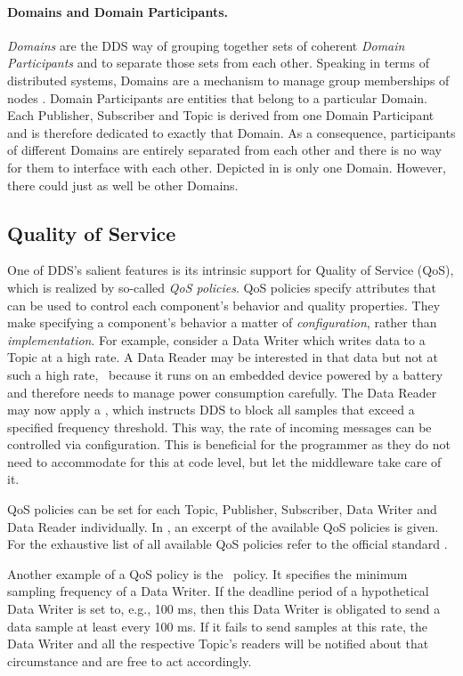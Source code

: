 \paragraph{Domains and Domain Participants.}
\emph{Domains} are the DDS way of grouping together sets of coherent \emph{Domain Participants} and to separate those sets from each other. Speaking in terms of distributed systems, Domains are a mechanism to manage group memberships of nodes \cite{tanenbaum2017distributed}. Domain Participants are entities that belong to a particular Domain. Each Publisher, Subscriber and Topic is derived from one Domain Participant and is therefore dedicated to exactly that Domain. As a consequence, participants of different Domains are entirely separated from each other and there is no way for them to interface with each other. Depicted in  is only one Domain. However, there could just as well be other Domains.


\subsection{Quality of Service}
One of DDS's salient features is its intrinsic support for Quality of Service (QoS), which is realized by so-called \emph{QoS policies}. QoS policies specify attributes that can be used to control each component's behavior and quality properties. They make specifying a component's behavior a matter of \emph{configuration}, rather than \emph{implementation}. For example, consider a Data Writer which writes data to a Topic at a high rate. A Data Reader may be interested in that data but not at such a high rate, \eg\ because it runs on an embedded device powered by a battery and therefore needs to manage power consumption carefully. The Data Reader may now apply a \tbf , which instructs DDS to block all samples that exceed a specified frequency threshold. This way, the rate of incoming messages can be controlled via configuration. This is beneficial for the programmer as they do not need to accommodate for this at code level, but let the middleware take care of it.

QoS policies can be set for each Topic, Publisher, Subscriber, Data Writer and Data Reader individually.
In , an excerpt of the available QoS policies is given. For the exhaustive list of all available QoS policies refer to the official standard \cite{dds-1.4-standard}.

Another example of a QoS policy is the \deadline\ policy. It specifies the minimum sampling frequency of a Data Writer. If the deadline period of a hypothetical Data Writer is set to, e.g., 100 ms, then this Data Writer is obligated to send a data sample at least every 100 ms. If it fails to send samples at this rate, the Data Writer and all the respective Topic's readers will be notified about that circumstance and are free to act accordingly.

